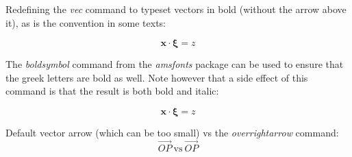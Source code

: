 \documentclass{scrartcl}
\begin{document}
Redefining the \emph{vec} command to typeset vectors in bold (without the arrow
above it), as is the convention in some texts:

\let\origvec\vec

\renewcommand{\vec}[1]{\mathbf{#1}}

\[
    \vec{x}\cdot\vec{\xi} = z
\]

The \emph{boldsymbol} command from the \emph{amsfonts} package can be used to ensure
that the greek letters are bold as well. Note however that a side effect of this
command is that the result is both bold and italic:

\renewcommand{\vec}[1]{\boldsymbol{#1}}

\[
    \vec{x}\cdot\vec{\xi} = z
\]

\let\vec\origvec

Default vector arrow (which can be too small) vs the \emph{overrightarrow} command:
\[
    \vec{OP}\ \text{vs}\ \overrightarrow{OP}
\]
\end{document}
